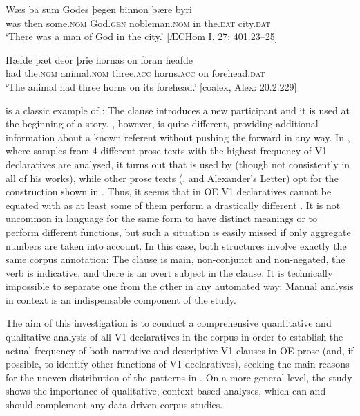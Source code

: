 \documentclass[output=paper,colorlinks,citecolor=brown]{langscibook}
\begin{document}
\ea%
\label{ex:cichosz:1}
\gll Wæs  þa  sum   Godes   þegen    binnon  þære byri \\
was then some.\textsc{nom}  God.\textsc{gen}  nobleman.\textsc{nom}  in  the.\textsc{dat} city.\textsc{dat} \\
\glt ‘There was a man of God in the city.' \hfill [ÆCHom I, 27: 401.23--25]
\z 

\ea%
\label{ex:cichosz:2}
\gll Hæfde  þæt   deor   þrie   hornas   on foran heafde \\
had the.\textsc{nom}  animal.\textsc{nom} three.\textsc{acc}  horns.\textsc{acc} on forehead.\textsc{dat} \\
\glt ‘The animal had three horns on its forehead.' \hfill [coalex, Alex: 20.2.229]
\z 

 is a classic example of : The clause introduces a new participant and it is used at the beginning of a story. , however, is quite different, providing additional information about a known referent without pushing the  forward in any way. In \citet{Cichosz2022}, where samples from 4 different prose texts with the highest frequency of V1 declaratives are analysed, it turns out that  is used by  (though not consistently in all of his works), while other prose texts (,  and Alexander's Letter) opt for the construction shown in . Thus, it seems that in OE V1 declaratives cannot be equated with  as at least some of them perform a drastically different . It is not uncommon in language for the same form to have distinct meanings or to perform different functions, but such a situation is easily missed if only aggregate numbers are taken into account. In this case, both structures involve exactly the same corpus annotation: The clause is main, non-conjunct and non-negated, the verb is indicative, and there is an overt subject in the clause. It is technically impossible to separate one from the other in any automated way: Manual analysis in context is an indispensable component of the study.

The aim of this investigation is to conduct a comprehensive quantitative and qualitative analysis of all V1 declaratives in the  corpus in order to establish the actual frequency of both narrative and descriptive V1 clauses in OE prose (and, if possible, to identify other functions of V1 declaratives), seeking the main reasons for the uneven distribution of the patterns in . On a more general level, the study shows the importance of qualitative, context-based analyses, which can and should complement any data-driven corpus studies.
\end{document}
